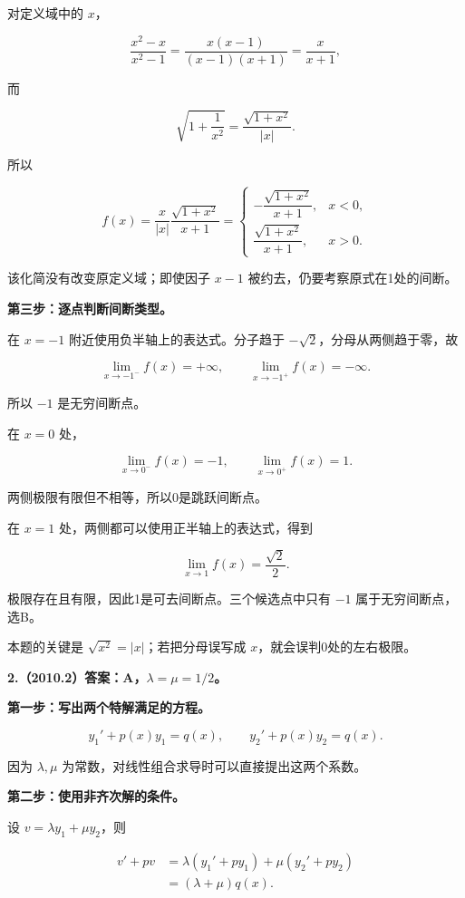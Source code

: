 \documentclass[UTF8,11pt,fontset=windows]{ctexart}
\begin{document}
对定义域中的 $x$，

$$
\frac{x^2-x}{x^2-1}=\frac{x(x-1)}{(x-1)(x+1)}=\frac{x}{x+1},
$$

而

$$
\sqrt{1+\frac1{x^2}}=\frac{\sqrt{1+x^2}}{|x|}.
$$

所以

$$
f(x)=\frac{x}{|x|}\frac{\sqrt{1+x^2}}{x+1}
=\begin{cases}
-\dfrac{\sqrt{1+x^2}}{x+1},&x<0,\\[4pt]
\dfrac{\sqrt{1+x^2}}{x+1},&x>0.
\end{cases}
$$

该化简没有改变原定义域；即使因子 $x-1$ 被约去，仍要考察原式在1处的间断。

\textbf{第三步：逐点判断间断类型。}

在 $x=-1$ 附近使用负半轴上的表达式。分子趋于 $-\sqrt2$，分母从两侧趋于零，故

$$
\lim_{x\to-1^-}f(x)=+\infty,
\qquad \lim_{x\to-1^+}f(x)=-\infty.
$$

所以 $-1$ 是无穷间断点。

在 $x=0$ 处，

$$
\lim_{x\to0^-}f(x)=-1,
\qquad \lim_{x\to0^+}f(x)=1.
$$

两侧极限有限但不相等，所以0是跳跃间断点。

在 $x=1$ 处，两侧都可以使用正半轴上的表达式，得到

$$
\lim_{x\to1}f(x)=\frac{\sqrt2}{2}.
$$

极限存在且有限，因此1是可去间断点。三个候选点中只有 $-1$ 属于无穷间断点，选B。

本题的关键是 $\sqrt{x^2}=|x|$；若把分母误写成 $x$，就会误判0处的左右极限。

\clearpage

\textbf{2.（2010.2）答案：A，$\lambda=\mu=1/2$。}

\textbf{第一步：写出两个特解满足的方程。}

$$
y_1'+p(x)y_1=q(x),
\qquad y_2'+p(x)y_2=q(x).
$$

因为 $\lambda,\mu$ 为常数，对线性组合求导时可以直接提出这两个系数。

\textbf{第二步：使用非齐次解的条件。}

设 $v=\lambda y_1+\mu y_2$，则

$$
\begin{aligned}
v'+pv
&=\lambda(y_1'+py_1)+\mu(y_2'+py_2)\\
&=(\lambda+\mu)q(x).
\end{aligned}
$$
\end{document}
